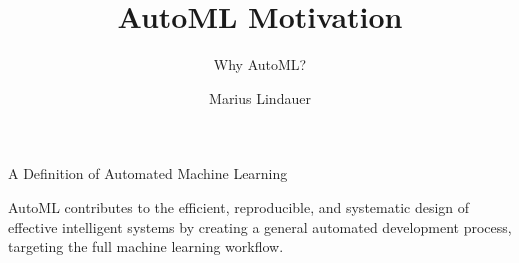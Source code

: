 \documentclass[main]{subfiles}
\title[AutoML: Introduction]{AutoML Motivation}
\subtitle{Why AutoML?}
\author[Marius Lindauer]{Marius Lindauer}
\date{}
\begin{document}
	
	\maketitle
	

\begin{frame}[c]{A Definition of \alert{Automated} Machine Learning}

\begin{center}
AutoML contributes to the efficient, reproducible, and systematic design of effective intelligent systems by creating a general automated development process, targeting the full machine learning workflow. 
\end{center}

\end{frame}
\end{document}
